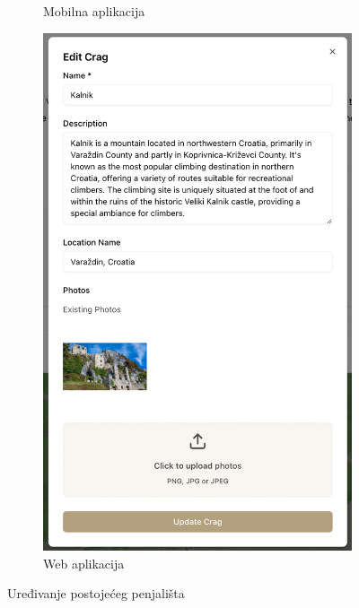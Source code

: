 \begin{figure}[H]
\begin{subfigure}[b]{0.36\textwidth}
        \caption{Mobilna aplikacija}
        \label{fig:uredjivanje_lokacije_mob}
    \end{subfigure}
    \hfill
    \begin{subfigure}[b]{0.47\textwidth}
        \centering
        \includegraphics[width=\textwidth]{images/implementacija/web/editing-options/edit-crag.png}
        \caption{Web aplikacija}
        \label{fig:uredjivanje_lokacije_web}
    \end{subfigure}
    \caption{Uređivanje postojećeg penjališta}
    \label{fig:uredjivanje_lokacije}
\end{figure}

